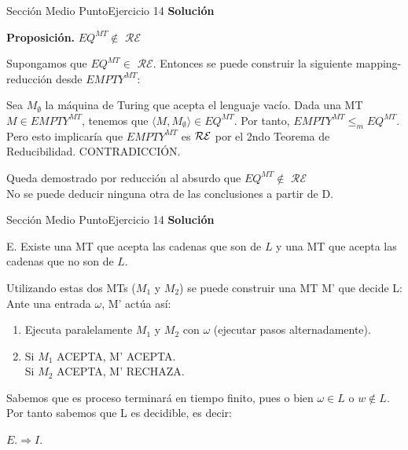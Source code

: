 \documentclass[10pt, envcountsect, presentation, aspectratio=169]{beamer}
\newcommand{\lr}{\ensuremath{\mathcal {RE}}}
\begin{document}
\begin{frame}{Sección Medio Punto}{Ejercicio 14}
    \textbf{Solución}\\
     \begin{center}
        \textbf{Proposición.} $EQ^{MT} \notin$ \lr
    \end{center}
    Supongamos que $EQ^{MT}\in$ \lr. Entonces se puede construir la siguiente mapping-reducción desde $EMPTY^{MT}$:
    
    \vspace{3mm}
    Sea $M_{\emptyset}$ la máquina de Turing que acepta el lenguaje vacío. Dada una MT $M \in EMPTY^{MT}$, tenemos que $\langle M, M_{\emptyset}\rangle \in EQ^{MT}$. Por tanto, $EMPTY^{MT} \leq_{m} EQ^{MT}$. Pero esto implicaría que $EMPTY^{MT}$ es $\mathcal{RE} \space$ por el 2ndo Teorema de Reducibilidad. CONTRADICCIÓN.
    
    \vspace{3mm}
    Queda demostrado por reducción al absurdo que $EQ^{MT} \notin$ \lr\\
    
    \vspace{3mm}
    No se puede deducir ninguna otra de las conclusiones a partir de D.
    
\end{frame}

\begin{frame}{Sección Medio Punto}{Ejercicio 14}
    \textbf{Solución}\\
     \begin{center}
        E. Existe una MT que acepta las cadenas que son de $L$ y una MT que acepta las cadenas que no son de $L$.   
    \end{center}
    Utilizando estas dos MTs ($M_1$ y $M_2$) se puede construir una MT M' que decide L:
    Ante una entrada $\omega$, M' actúa así:
    \begin{enumerate}[1.] 
        \item Ejecuta paralelamente $M_1$ y $M_2$ con $\omega$ (ejecutar pasos alternadamente). 
        \item   Si $M_1$ ACEPTA, M' ACEPTA.\\
                Si $M_2$ ACEPTA, M' RECHAZA.
    \end{enumerate}
        
    \vspace{3mm}
    Sabemos que es proceso terminará en tiempo finito, pues o bien $\omega \in L$ o $w \notin L$.
    Por tanto sabemos que L es decidible, es decir:
    \begin{center}
        $E. \Rightarrow I.$
    \end{center}
\end{frame}
\end{document}
